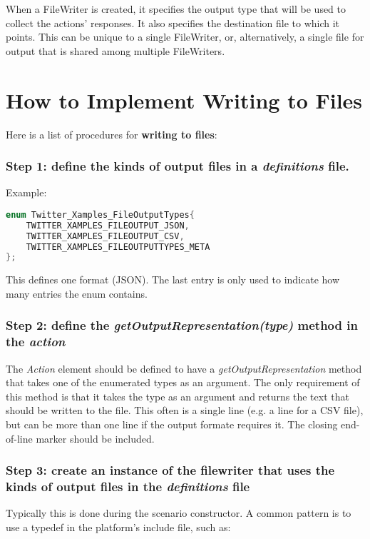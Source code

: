 When a FileWriter is created, it specifies the output type that will be used to collect the actions' responses. It also specifies the destination file to which it points. This can be unique to a single FileWriter, or, alternatively, a single file for output that is shared among multiple FileWriters.

\section{How to Implement Writing to Files}
Here is a list of procedures for \textbf{writing to files}:

\subsubsection {Step 1: define the kinds of output files in a \textit{definitions} file.}
\par Example:
\begin{lstlisting}[frame=single, language=C++]
enum Twitter_Xamples_FileOutputTypes{
	TWITTER_XAMPLES_FILEOUTPUT_JSON,
	TWITTER_XAMPLES_FILEOUTPUT_CSV,
	TWITTER_XAMPLES_FILEOUTPUTTYPES_META
};
\end{lstlisting}	

This defines one format (JSON). The last entry is only used to indicate how many entries the enum contains.

\subsubsection{Step 2: define the \textit{getOutputRepresentation(type)} method in the \textit{action}}
The \textit{Action} element should be defined to have a \textit{getOutputRepresentation} method that takes one of the enumerated types as an argument. The only requirement of this method is that it takes the type as an argument and returns the text that should be written to the file. This often is a single line (e.g. a line for a CSV file), but can be more than one line if the output formate requires it. The closing end-of-line marker should be included.


\subsubsection{Step 3: create an instance of the filewriter that uses the kinds of output files in the \textit{definitions} file}
Typically this is done during the scenario constructor. A common pattern is to use a typedef in the platform's include file, such as:

